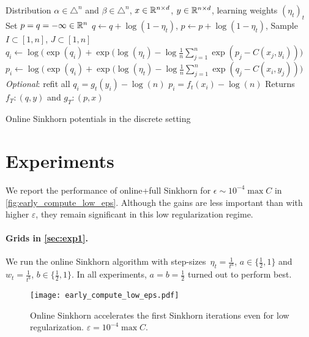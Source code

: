 \begin{algorithm}[t]
    \begin{algorithmic}
    \Input Distribution $\alpha \in \triangle^n$ and 
    $\beta \in \triangle^n$, $x \in \mathbb{R}^{n \times d}$, 
    $y \in \mathbb{R}^{n \times d}$, learning weights ${(\eta_t)}_t$
    \State Set $p = q = - \infty \in \mathbb{R}^n$
        \State $q \gets q + \log(1 - \eta_t)$, $p \gets p + \log(1 - \eta_t)$,
        \State Sample $I \subset [1, n]$, $J \subset [1, n]$
            \State $q_i \gets \log \big( \exp(q_i)
            + \exp(\log(\eta_t) - \log \frac{1}{n} 
            \sum_{j=1}^{n} \exp(p_j - C(x_j, y_i)) \big) $
        \EndFor
        \State $p_i \gets \log \big( \exp(q_i)
        + \exp(\log(\eta_t) - \log \frac{1}{n} 
        \sum_{j=1}^{n} \exp(q_j - C(x_i, y_j)) \big)$
        \EndFor
        \State \textit{Optional}: refit all $q_i = g_t(y_i) - \log (n)$
        \State\hspace{2.45cm} $p_i = f_t(x_i) - \log (n)$
    \EndFor
    \State Returns $f_T : (q, y)$ and
    $g_T : (p, x)$
    \end{algorithmic}
    \caption{Online Sinkhorn potentials in the discrete setting}\label{alg:discrete_online}
\end{algorithm}



\section{Experiments}\label{sec:supp_exp}

We report the performance of online+full Sinkhorn for $\epsilon \sim 10^{-4}
\max C$ in \autoref{fig:early_compute_low_eps}. Although the gains are less
important than with higher $\varepsilon$, they remain significant in this low
regularization regime.

\paragraph{Grids in \autoref{sec:exp1}.} We run the online Sinkhorn algorithm
with step-sizes $\eta_t = \frac{1}{t^a}$, $a \in \{ \frac{1}{2}, 1 \}$
and $w_t = \frac{1}{{t^b}}$, $b \in \{ \frac{1}{2}, 1 \}$. In all
experiments, $a = b = \frac{1}{2}$ turned out to perform best.

\begin{figure}[ht]
    \centering
    \texttt{[image: early\_compute\_low\_eps.pdf]}
    \caption{Online Sinkhorn accelerates the first Sinkhorn iterations even for low regularization. $\varepsilon = 10^{-4} \max C$.}
    \label{fig:early_compute_low_eps}
\end{figure}
